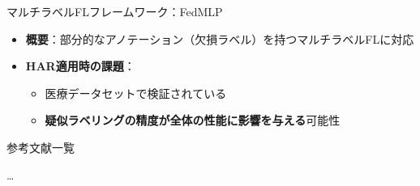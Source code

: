 \documentclass[unicode,12pt,aspectratio=169,dvipdfmx]{beamer}
\begin{document}
\begin{frame}{マルチラベルFLフレームワーク：FedMLP}
\begin{itemize}
    \item \textbf{概要}：{部分的なアノテーション（欠損ラベル）を持つマルチラベルFL}に対応
    \item \textbf{HAR適用時の課題}：
    \begin{itemize}
        \item 医療データセットで検証されている
        \item \textbf{疑似ラベリングの精度が全体の性能に影響を与える}可能性
    \end{itemize}
\end{itemize}
\end{frame}




\begin{frame}{参考文献一覧}
  \small
  \begin{thebibliography}{9}
     … 
  \end{thebibliography}
\end{frame}
\end{document}
